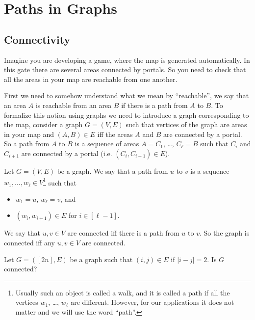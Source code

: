 \chapter{Paths in Graphs}
\label{chapter:paths}
\section{Connectivity}
Imagine you are developing a game, where the map is generated automatically.
In this gate there are several areas connected by portals. So you need to check
that all the areas in your map are reachable from one another.

First we need to somehow understand what we mean by ``reachable'', we say that
an area $A$ is reachable from an area $B$ if there is a path from $A$ to
$B$. To formalize this notion using graphs we need to introduce a graph
corresponding to the map, consider a graph $G = (V, E)$ such that vertices of
the graph are areas in your map and $(A, B) \in E$ iff the areas $A$ and $B$
are connected by a portal. So a path from $A$ to $B$ is a sequence of areas
$A = C_1$, \dots, $C_\ell = B$ such that $C_i$ and $C_{i + 1}$ are connected by
a portal (i.e. $(C_i, C_{i + 1}) \in E$).
\begin{definition}
  Let $G = (V, E)$ be a graph. We say that a path from $u$ to $v$ is
  a sequence $w_1, \dots, w_\ell \in V$\footnote{%
    Usually such an object is called a walk, and it is called a path if
    all the vertices $w_1$, \dots, $w_\ell$ are different. However,
    for our applications it does not matter and we will use the word ``path''.
  } such that
  \begin{itemize}
    \item $w_1 = u$, $w_\ell = v$, and
    \item $(w_i, w_{i + 1}) \in E$ for $i \in [\ell - 1]$.
  \end{itemize}

  We say that $u, v \in V$ are connected iff there is a path from $u$ to $v$.
  So the graph is connected iff any $u, v \in V$ are connected.
\end{definition}

\begin{exercise}
  Let $G = ([2n], E)$ be a graph such that $(i, j) \in E$ if $|i - j| = 2$.
  Is $G$ connected?
\end{exercise}

